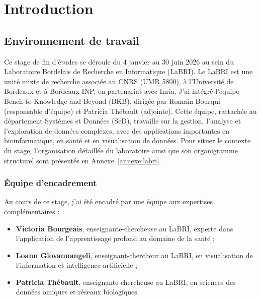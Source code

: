 \section{Introduction}

\subsection{Environnement de travail}

Ce stage de fin d'études se déroule du 4 janvier au 30 juin 2026 au sein du Laboratoire Bordelais de Recherche en Informatique (LaBRI). Le LaBRI est une unité mixte de recherche associée au CNRS (UMR 5800), à l'Université de Bordeaux et à Bordeaux INP, en partenariat avec Inria. J'ai intégré l'équipe Bench to Knowledge and Beyond (BKB), dirigée par Romain Bourqui (responsable d'équipe) et Patricia Thébault (adjointe). Cette équipe, rattachée au département Systèmes et Données (SeD), travaille sur la gestion, l'analyse et l'exploration de données complexes, avec des applications importantes en bioinformatique, en santé et en visualisation de données. Pour situer le contexte du stage, l'organisation détaillée du laboratoire ainsi que son organigramme structurel sont présentés en Annexe~\ref{annexe:labri}.

\subsubsection*{Équipe d'encadrement}
Au cours de ce stage, j'ai été encadré par une équipe aux expertises complémentaires :
\begin{itemize}
    \item \textbf{Victoria Bourgeais}, enseignante-chercheuse au LaBRI, experte dans l'application de l'apprentissage profond au domaine de la santé ;
    \item \textbf{Loann Giovannangeli}, enseignant-chercheur au LaBRI, en visualisation de l'information et intelligence artificielle ;
    \item \textbf{Patricia Thébault}, enseignante-chercheuse au LaBRI, en sciences des données omiques et réseaux biologiques.
\end{itemize}

